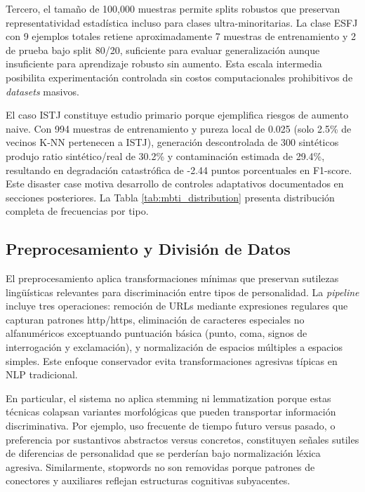 Tercero, el tamaño de 100,000 muestras permite splits robustos que preservan representatividad estadística incluso para clases ultra-minoritarias. La clase ESFJ con 9 ejemplos totales retiene aproximadamente 7 muestras de entrenamiento y 2 de prueba bajo split 80/20, suficiente para evaluar generalización aunque insuficiente para aprendizaje robusto sin aumento. Esta escala intermedia posibilita experimentación controlada sin costos computacionales prohibitivos de \textit{datasets} masivos.

El caso ISTJ constituye estudio primario porque ejemplifica riesgos de aumento naive. Con 994 muestras de entrenamiento y pureza local de 0.025 (solo 2.5\% de vecinos K-NN pertenecen a ISTJ), generación descontrolada de 300 sintéticos produjo ratio sintético/real de 30.2\% y contaminación estimada de 29.4\%, resultando en degradación catastrófica de -2.44 puntos porcentuales en F1-score. Este disaster case motiva desarrollo de controles adaptativos documentados en secciones posteriores. La Tabla \ref{tab:mbti_distribution} presenta distribución completa de frecuencias por tipo.

\subsection{Preprocesamiento y División de Datos}
\label{subsec:preprocesamiento}

El preprocesamiento aplica transformaciones mínimas que preservan sutilezas lingüísticas relevantes para discriminación entre tipos de personalidad. La \textit{pipeline} incluye tres operaciones: remoción de URLs mediante expresiones regulares que capturan patrones http/https, eliminación de caracteres especiales no alfanuméricos exceptuando puntuación básica (punto, coma, signos de interrogación y exclamación), y normalización de espacios múltiples a espacios simples. Este enfoque conservador evita transformaciones agresivas típicas en NLP tradicional.

En particular, el sistema no aplica stemming ni lemmatization porque estas técnicas colapsan variantes morfológicas que pueden transportar información discriminativa. Por ejemplo, uso frecuente de tiempo futuro versus pasado, o preferencia por sustantivos abstractos versus concretos, constituyen señales sutiles de diferencias de personalidad que se perderían bajo normalización léxica agresiva. Similarmente, stopwords no son removidas porque patrones de conectores y auxiliares reflejan estructuras cognitivas subyacentes.

